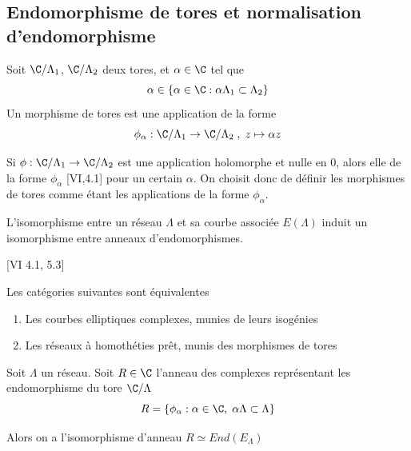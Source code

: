\subsection{Endomorphisme de tores et normalisation d'endomorphisme}

\begin{Def}
	Soit $\C/\Lambda_1$, $\C/\Lambda_2$ deux tores, et $\alpha\in\C$ tel que
	\begin{equation*}
		\alpha\in\left\lbrace \alpha\in\C : \alpha\Lambda_1 \subset \Lambda_2\right\rbrace  
	\end{equation*} 
	Un morphisme de tores est une application de la forme
	\begin{equation*}
		\phi_{\alpha} : \C/\Lambda_1 \rightarrow \C/\Lambda_2\; ,\; z \mapsto \alpha z
	\end{equation*}
	
\end{Def}

\begin{Rem}
	Si $\phi: \C/\Lambda_1 \rightarrow \C/\Lambda_2$ est une application holomorphe et nulle en $0$, alors elle de la forme $\phi_{\alpha}$ \cite{Sil09}[VI,4.1] pour un certain $\alpha$. On choisit donc de définir les morphismes de tores comme étant les applications de la forme $\phi_{\alpha}$.
	
\end{Rem}

L'isomorphisme entre un réseau $\Lambda$ et sa courbe associée $E(\Lambda)$ induit un isomorphisme entre anneaux d'endomorphismes.

\begin{The}\cite{Sil09}[VI 4.1, 5.3]
	
	Les catégories suivantes sont équivalentes
	\begin{enumerate}
		\item Les courbes elliptiques complexes, munies de leurs isogénies
		\item Les réseaux à homothéties prêt, munis des morphismes de tores
	\end{enumerate}
\end{The}

\begin{Coro}
	Soit $\Lambda$ un réseau. Soit $R\in\C$ l'anneau des complexes représentant les endomorphisme du tore $\C/\Lambda$
	\begin{equation*}
		R = \left\lbrace \phi_{\alpha} :  \alpha\in\C ,\; \alpha\Lambda \subset \Lambda \right\rbrace 
	\end{equation*}
	
	Alors on a l'isomorphisme d'anneau $R\simeq End(E_{\Lambda})$
\end{Coro}

